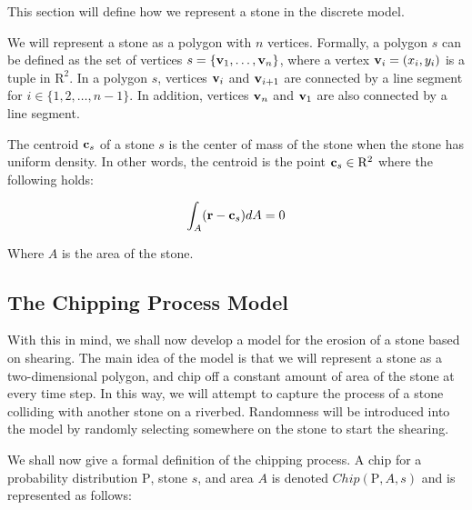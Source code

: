 This section will define how we represent a stone in the discrete model.

We will represent a stone as a polygon with $n$ vertices. Formally, a polygon $s$ can be defined as the set of vertices $s = \{ \mathbf{v}_1, \ldots, \mathbf{v}_n \}$, where a vertex $\mathbf{v}_i = (x_i, y_i)$ is a tuple in $\mathrm{R}^2$. In a polygon $s$, vertices $\mathbf{v}_i$ and $\mathbf{v}_{i+1}$ are connected by a line segment for $i \in \{1,2, \ldots, n-1\}$. In addition, vertices $\mathbf{v}_{n}$ and $\mathbf{v}_1$ are also connected by a line segment.

The centroid $\mathbf{c}_s$ of a stone $s$ is the center of mass of the stone when the stone has uniform density. In other words, the centroid is the point $\mathbf{c}_s \in \mathrm{R}^2$ where the following holds:

\begin{eqnarray}
 \int_A (\mathbf{r} - \mathbf{c}_s) dA = 0
\end{eqnarray}

Where $A$ is the area of the stone.

\subsection{The Chipping Process Model}

With this in mind, we shall now develop a model for the erosion of a stone based on shearing. The main idea of the model is that we will represent a stone as a two-dimensional polygon, and chip off a constant amount of area of the stone at every time step. In this way, we will attempt to capture the process of a stone colliding with another stone on a riverbed. Randomness will be introduced into the model by randomly selecting somewhere on the stone to start the shearing.

We shall now give a formal definition of the chipping process. A chip for a probability distribution $\mathrm{P}$, stone $s$, and area $A$ is denoted $Chip(\mathrm{P}, A, s)$ and is represented as follows:

